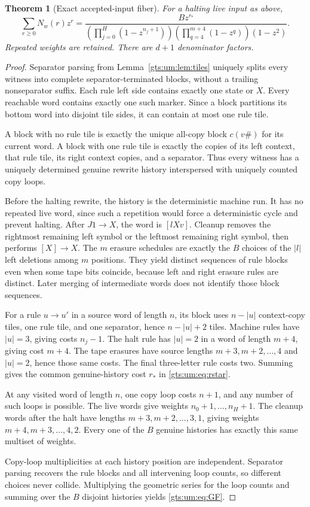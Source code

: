 \documentclass[11pt,letterpaper]{article}
\newtheorem{theorem}{Theorem}[section]
\theoremstyle{definition}
\theoremstyle{remark}
\newcommand{\hto}{\mathrel{\longrightarrow}}
\begin{document}
\begin{theorem}[Exact accepted-input fiber]\label{gts:um:thm:GF}
For a halting live input as above,
\begin{equation}\label{gts:um:eq:GF}
 \sum_{r\geq0}N_w(r)z^r
 =\frac{Bz^{r_*}}
 {\displaystyle\left(\prod_{j=0}^{H}(1-z^{n_j+1})\right)
  \left(\prod_{q=4}^{m+4}(1-z^q)\right)(1-z^2)}.
\end{equation}
Repeated weights are retained. There are $d+1$ denominator factors.
\end{theorem}
\begin{proof}
Separator parsing from Lemma~\ref{gts:um:lem:tiles} uniquely splits every witness into complete separator-terminated blocks, without a trailing nonseparator suffix. Each rule left side contains exactly one state or $X$. Every reachable word contains exactly one such marker. Since a block partitions its bottom word into disjoint tile sides, it can contain at most one rule tile.

A block with no rule tile is exactly the unique all-copy block $c(v\#)$ for its current word. A block with one rule tile is exactly the copies of its left context, that rule tile, its right context copies, and a separator. Thus every witness has a uniquely determined genuine rewrite history interspersed with uniquely counted copy loops.

Before the halting rewrite, the history is the deterministic machine run. It has no repeated live word, since such a repetition would force a deterministic cycle and prevent halting. After $J1\hto X$, the word is $[lXv]$. Cleanup removes the rightmost remaining left symbol or the leftmost remaining right symbol, then performs $[X]\hto X$. The $m$ erasure schedules are exactly the $B$ choices of the $|l|$ left deletions among $m$ positions. They yield distinct sequences of rule blocks even when some tape bits coincide, because left and right erasure rules are distinct. Later merging of intermediate words does not identify those block sequences.

For a rule $u\hto u'$ in a source word of length $n$, its block uses $n-|u|$ context-copy tiles, one rule tile, and one separator, hence $n-|u|+2$ tiles. Machine rules have $|u|=3$, giving costs $n_j-1$. The halt rule has $|u|=2$ in a word of length $m+4$, giving cost $m+4$. The tape erasures have source lengths $m+3,m+2,\ldots,4$ and $|u|=2$, hence those same costs. The final three-letter rule costs two. Summing gives the common genuine-history cost $r_*$ in \eqref{gts:um:eq:rstar}.

At any visited word of length $n$, one copy loop costs $n+1$, and any number of such loops is possible. The live words give weights $n_0+1,\ldots,n_H+1$. The cleanup words after the halt have lengths $m+3,m+2,\ldots,3,1$, giving weights $m+4,m+3,\ldots,4,2$. Every one of the $B$ genuine histories has exactly this same multiset of weights.

Copy-loop multiplicities at each history position are independent. Separator parsing recovers the rule blocks and all intervening loop counts, so different choices never collide. Multiplying the geometric series for the loop counts and summing over the $B$ disjoint histories yields \eqref{gts:um:eq:GF}.
\end{proof}
\end{document}
